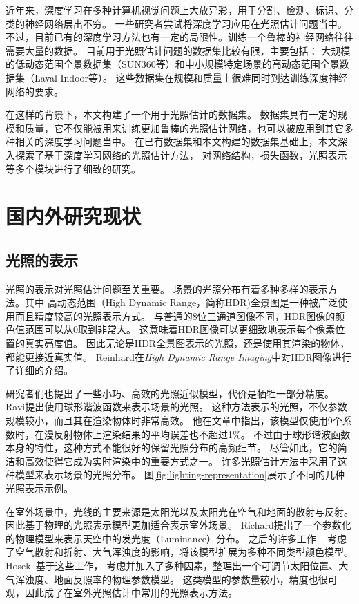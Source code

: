 近年来，深度学习在多种计算机视觉问题上大放异彩，用于分割、检测、标识、分类的神经网络层出不穷。
一些研究者尝试将深度学习应用在光照估计问题当中。
不过，目前已有的深度学习方法也有一定的局限性。训练一个鲁棒的神经网络往往需要大量的数据。
目前用于光照估计问题的数据集比较有限，主要包括：
大规模的低动态范围全景数据集（SUN360等）和中小规模特定场景的高动态范围全景数据集（Laval Indoor等）。
这些数据集在规模和质量上很难同时到达训练深度神经网络的要求。

在这样的背景下，本文构建了一个用于光照估计的数据集。
数据集具有一定的规模和质量，它不仅能被用来训练更加鲁棒的光照估计网络，也可以被应用到其它多种相关的深度学习问题当中。
在已有数据集和本文构建的数据集基础上，本文深入探索了基于深度学习网络的光照估计方法，
对网络结构，损失函数，光照表示等多个模块进行了细致的研究。

\section{国内外研究现状}
\subsection{光照的表示}
光照的表示对光照估计问题至关重要。
场景的光照分布有着多种多样的表示方法。其中
高动态范围（High Dynamic Range，简称HDR)全景图是一种被广泛使用而且精度较高的光照表示方式。
与普通的8位三通道图像不同，HDR图像的颜色值范围可以从0取到非常大。
这意味着HDR图像可以更细致地表示每个像素位置的真实亮度值。
因此无论是HDR全景图表示的光照，还是使用其渲染的物体，都能更接近真实值。
Reinhard在\textit{High Dynamic Range Imaging}\cite{reinhard2010high}中对HDR图像进行了详细的介绍。

研究者们也提出了一些小巧、高效的光照近似模型，代价是牺牲一部分精度。
Ravi\cite{ramamoorthi2001efficient}提出使用球形谐波函数来表示场景的光照。
这种方法表示的光照，不仅参数规模较小，而且其在渲染物体时非常高效。
他在文章中指出，该模型仅使用9个系数时，在漫反射物体上渲染结果的平均误差也不超过1\%。
不过由于球形谐波函数本身的特性，这种方式不能很好的保留光照分布的高频细节。
尽管如此，它的简洁和高效使得它成为实时渲染中的重要方式之一\cite{green2003spherical,sloan2008stupid}。
许多光照估计方法中采用了这种模型来表示场景的光照分布。
图\ref{fig:lighting-representation}展示了不同的几种光照表示示例。


在室外场景中，光线的主要来源是太阳光以及太阳光在空气和地面的散射与反射。
因此基于物理的光照表示模型更加适合表示室外场景。
Richard\cite{perez1993all}提出了一个参数化的物理模型来表示天空中的发光度（Luminance）分布。
之后的许多工作
~\cite{nishita1996display, sirai1993display, preetham1999practical,raab2008unbiased}
考虑了空气散射和折射、大气浑浊度的影响，将该模型扩展为多种不同类型颜色模型。
Hosek~\cite{hosek2012analytic, hovsekhovsek2013adding}基于这些工作，
考虑并加入了多种因素，整理出一个可调节太阳位置、大气浑浊度、地面反照率的物理参数模型。
这类模型的参数量较小，精度也很可观，因此成了在室外光照估计中常用的光照表示方法。


